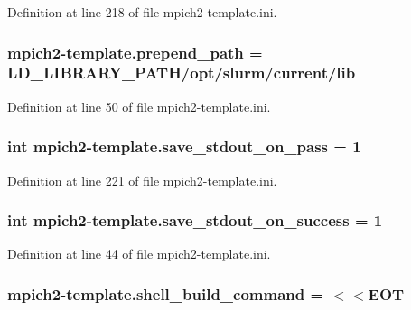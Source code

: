 Definition at line 218 of file mpich2-\/template.\-ini.

\hypertarget{namespacempich2-template_a6a8f9d4e233a444b8ec50c48c62fc4e4}{
\subsubsection[{prepend\-\_\-path}]{\setlength{\rightskip}{0pt plus 5cm}mpich2-\/template.\-prepend\-\_\-path = L\-D\-\_\-\-L\-I\-B\-R\-A\-R\-Y\-\_\-\-P\-A\-T\-H/opt/slurm/current/lib}}\label{namespacempich2-template_a6a8f9d4e233a444b8ec50c48c62fc4e4}


Definition at line 50 of file mpich2-\/template.\-ini.

\hypertarget{namespacempich2-template_ab8e41d30a18bb21a628c48447ef357a8}{
\subsubsection[{save\-\_\-stdout\-\_\-on\-\_\-pass}]{\setlength{\rightskip}{0pt plus 5cm}int mpich2-\/template.\-save\-\_\-stdout\-\_\-on\-\_\-pass = 1}}\label{namespacempich2-template_ab8e41d30a18bb21a628c48447ef357a8}


Definition at line 221 of file mpich2-\/template.\-ini.

\hypertarget{namespacempich2-template_aae7d34e11fae16b68e0cfd32f9b32044}{
\subsubsection[{save\-\_\-stdout\-\_\-on\-\_\-success}]{\setlength{\rightskip}{0pt plus 5cm}int mpich2-\/template.\-save\-\_\-stdout\-\_\-on\-\_\-success = 1}}\label{namespacempich2-template_aae7d34e11fae16b68e0cfd32f9b32044}


Definition at line 44 of file mpich2-\/template.\-ini.

\hypertarget{namespacempich2-template_a79f63031d3664a486ed5bab613e4468f}{
\subsubsection[{shell\-\_\-build\-\_\-command}]{\setlength{\rightskip}{0pt plus 5cm}mpich2-\/template.\-shell\-\_\-build\-\_\-command = $<$$<$E\-O\-T}}\label{namespacempich2-template_a79f63031d3664a486ed5bab613e4468f}


